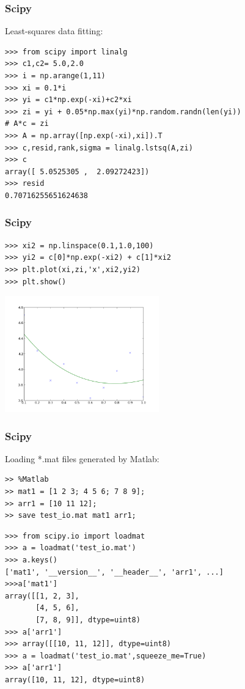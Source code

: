 \begin{frame}[fragile]
\frametitle{Scipy}
Least-squares data fitting:
\begin{myColorBox}{1.0}{}
\begin{verbatim}
>>> from scipy import linalg
>>> c1,c2= 5.0,2.0
>>> i = np.arange(1,11)
>>> xi = 0.1*i
>>> yi = c1*np.exp(-xi)+c2*xi
>>> zi = yi + 0.05*np.max(yi)*np.random.randn(len(yi))
# A*c = zi
>>> A = np.array([np.exp(-xi),xi]).T
>>> c,resid,rank,sigma = linalg.lstsq(A,zi)
>>> c
array([ 5.0525305 ,  2.09272423])
>>> resid
0.70716255651624638
\end{verbatim}
\end{myColorBox}
\end{frame}

\begin{frame}[fragile]
\frametitle{Scipy}
\begin{myColorBox}{0.9}{}
\begin{verbatim}
>>> xi2 = np.linspace(0.1,1.0,100)
>>> yi2 = c[0]*np.exp(-xi2) + c[1]*xi2
>>> plt.plot(xi,zi,'x',xi2,yi2)
>>> plt.show()\end{verbatim}
\end{myColorBox}
\pause
\begin{center}
      \includegraphics[width=0.5\textwidth]{pix/least_squares_example_1}
\end{center}
\end{frame}

\begin{frame}[fragile]
\frametitle{Scipy}
Loading *.mat files generated by Matlab:
\begin{myColorBox}{1.0}{}
\begin{verbatim}
>> %Matlab
>> mat1 = [1 2 3; 4 5 6; 7 8 9];
>> arr1 = [10 11 12];
>> save test_io.mat mat1 arr1;
\end{verbatim}
\end{myColorBox}
\pause
\begin{myColorBox}{1.0}{}
\begin{verbatim}
>>> from scipy.io import loadmat
>>> a = loadmat('test_io.mat')
>>> a.keys()
['mat1', '__version__', '__header__', 'arr1', ...]
>>>a['mat1']
array([[1, 2, 3],
       [4, 5, 6],
       [7, 8, 9]], dtype=uint8)
>>> a['arr1']
>>> array([[10, 11, 12]], dtype=uint8)
>>> a = loadmat('test_io.mat',squeeze_me=True)
>>> a['arr1']
array([10, 11, 12], dtype=uint8)
\end{verbatim}
\end{myColorBox}
\end{frame}

